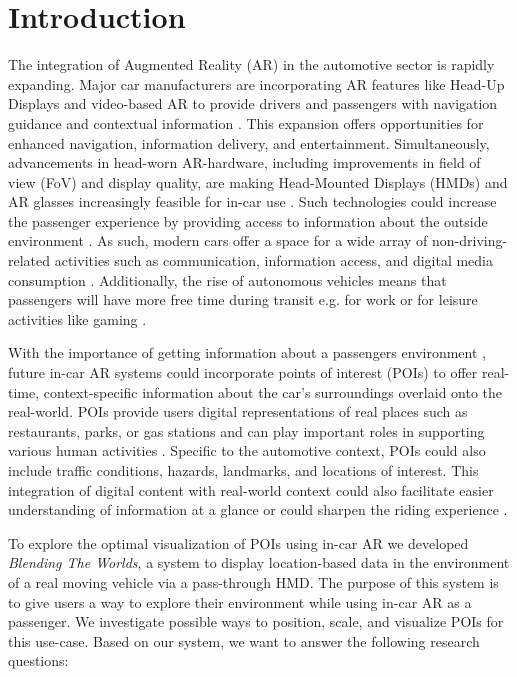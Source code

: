 \section{Introduction}
\label{section:introduction}
The integration of Augmented Reality (AR) in the automotive sector is rapidly expanding. Major car manufacturers are incorporating AR features like Head-Up Displays and video-based AR to provide drivers and passengers with navigation guidance and contextual information \cite{Elhattab23AutomotiveAR}. This expansion offers opportunities for enhanced navigation, information delivery, and entertainment. Simultaneously, advancements in head-worn AR-hardware, including improvements in field of view (FoV) and display quality, are making Head-Mounted Displays (HMDs) and AR glasses increasingly feasible for in-car use \cite{riegler2021augmented}. Such technologies could increase the passenger experience by providing access to information about the outside environment \cite{BergerGridStudyInCarPassenger2021}. As such, modern cars offer a space for a wide array of non-driving-related activities such as communication, information access, and digital media consumption \cite{MatsumuraActivePassengering18}. Additionally, the rise of autonomous vehicles means that passengers will have more free time during transit \cite{mcgill2020challenges} e.g. for work \cite{Mathis2021work, medeiros2022shielding} or for leisure activities like gaming \cite{Togwell2022gaming}. 

With the importance of getting information about a passengers environment \cite{BergerGridStudyInCarPassenger2021, Mehrabian74EnvironmentalPsychology, Pfleging16NDRNeeds, BergerRearSeatDoor21}, future in-car AR systems could incorporate points of interest (POIs) to offer real-time, context-specific information about the car's surroundings overlaid onto the real-world. POIs provide users digital representations of real places such as restaurants, parks, or gas stations \cite{Psyllidis2022POIs} and can play important roles in supporting various human activities \cite{sun2023conflating}. Specific to the automotive context, POIs could also include traffic conditions, hazards, landmarks, and locations of interest. This integration of digital content with real-world context could also facilitate easier understanding of information at a glance \cite{haeuslschmid2016design} or could sharpen the riding experience \cite{MatsumuraActivePassengering18}.

To explore the optimal visualization of POIs using in-car AR we developed \textit{Blending The Worlds}, a system to display location-based data in the environment of a real moving vehicle via a pass-through HMD. The purpose of this system is to give users a way to explore their environment while using in-car AR as a passenger. We investigate possible ways to position, scale, and visualize POIs for this use-case. Based on our system, we want to answer the following research questions:

